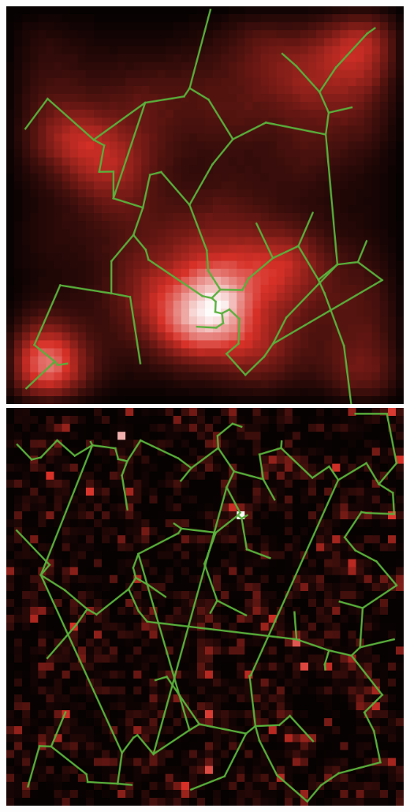 \documentclass[english,11pt]{beamer}
\begin{document}
{\begin{columns}
\centering
\includegraphics[width=\textwidth]{figures/corr_2_param71913_seed10}\hspace{0.1cm}\\
\includegraphics[width=\textwidth]{figures/corr_3_param71918_seed0}


\end{columns}}
\end{document}
